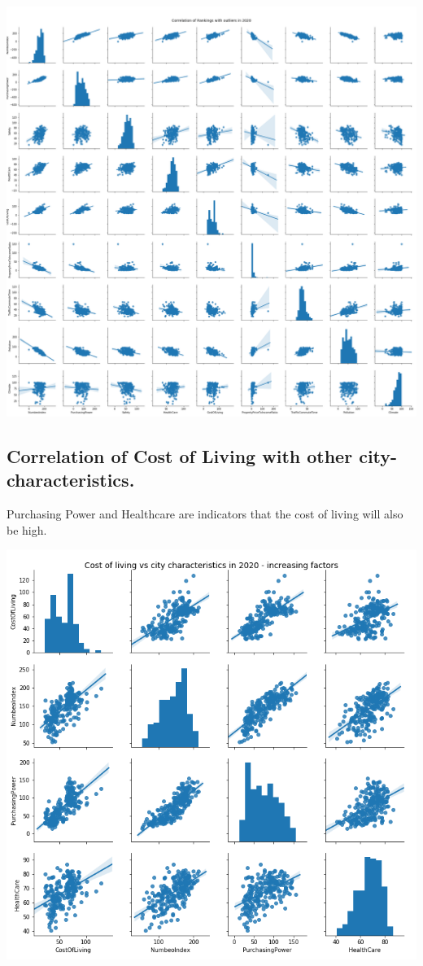 \documentclass[
  twocolumn]{article}
\begin{document}
\includegraphics[width=1\linewidth]{visuals/CorrelationOfRankingsIn2020WithOutliers}

\hypertarget{correlation-of-cost-of-living-with-other-city-characteristics.}{%
\subsection{Correlation of Cost of Living with other
city-characteristics.}\label{correlation-of-cost-of-living-with-other-city-characteristics.}}

Purchasing Power and Healthcare are indicators that the cost of living
will also be high.

\includegraphics[width=1\linewidth]{visuals/CostOfLivingCorrelationIn2020}
\end{document}
